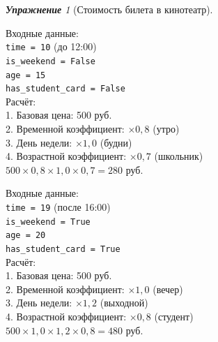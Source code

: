 \documentclass[a4paper,12pt]{article}
\theoremstyle{remark}
\newtheorem{exercise}{\textbf{Упражнение}}[section]
\begin{document}
\begin{exercise}[Стоимость билета в кинотеатр]
\begin{outputformat}[title=Пример 1]
    Входные данные: \\
    \texttt{time = 10} (до 12:00) \\
    \texttt{is\_weekend = False} \\
    \texttt{age = 15} \\
    \texttt{has\_student\_card = False} \\[4pt]
    Расчёт: \\
    1. Базовая цена: 500 руб. \\
    2. Временной коэффициент: $\times 0{,}8$ (утро) \\
    3. День недели: $\times 1{,}0$ (будни) \\
    4. Возрастной коэффициент: $\times 0{,}7$ (школьник) \\[4pt]
    $500 \times 0{,}8 \times 1{,}0 \times 0{,}7 = 280$ руб.
\end{outputformat}

\begin{outputformat}[title=Пример 2]
    Входные данные: \\
    \texttt{time = 19} (после 16:00) \\
    \texttt{is\_weekend = True} \\
    \texttt{age = 20} \\
    \texttt{has\_student\_card = True} \\[4pt]
    Расчёт: \\
    1. Базовая цена: 500 руб. \\
    2. Временной коэффициент: $\times 1{,}0$ (вечер) \\
    3. День недели: $\times 1{,}2$ (выходной) \\
    4. Возрастной коэффициент: $\times 0{,}8$ (студент) \\[4pt]
    $500 \times 1{,}0 \times 1{,}2 \times 0{,}8 = 480$ руб.
\end{outputformat}

\end{exercise}
\end{document}
